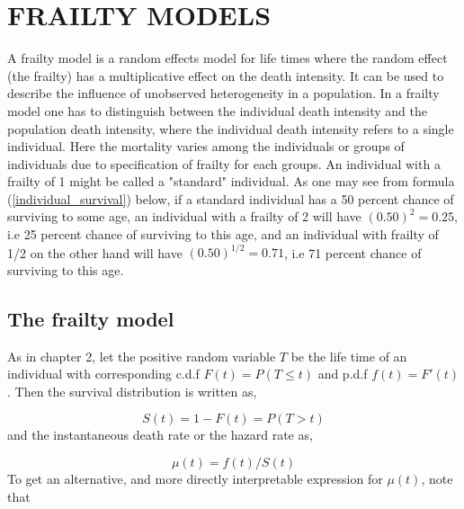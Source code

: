 
\chapter{FRAILTY MODELS}
\label{sec:fifth}



A frailty model is a random effects model for life times where the random effect (the frailty) has a multiplicative effect on the death intensity. 
It can be used to describe the influence of unobserved heterogeneity in a population.
In a frailty model  one has to distinguish between the individual death intensity and the population death intensity, where the individual death intensity refers to a single individual.
Here the mortality varies among the individuals or groups of individuals due to specification of frailty for each groups.
An individual with a frailty of 1 might be called a "standard" individual.
As one may see from formula (\ref{individual_survival}) below, if a standard individual has a 50 percent chance of surviving  to some age, an individual with a frailty of 2 will have $ (0.50)^2 = 0.25 $, i.e  25 percent chance of surviving to this age,  and  an individual with frailty of 1/2 on the other hand will have $ (0.50)^{1/2} = 0.71$, i.e 71 percent chance of surviving to this age.


\section{The frailty model}

As in chapter 2, let the positive random variable $T$ be the life time of an individual with corresponding  
c.d.f $F(t) = P(T \leq{t} )$ and p.d.f $f(t) = F'(t)$. 
Then the survival distribution is written as, 


\begin{equation*}
  S(t) = 1 - F(t)= P(T > t )   
\end{equation*}
and the instantaneous death rate or the hazard rate as,


\begin{equation*}
 \mu(t) = f(t) / S(t) 
\end{equation*}
To get an alternative, and more directly interpretable expression for $\mu(t)$, note that

